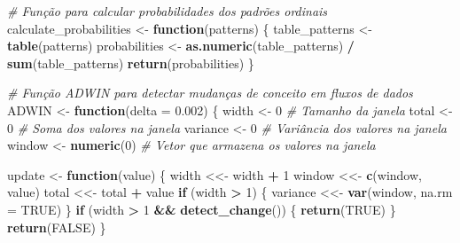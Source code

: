 \documentclass[
]{article}
\newenvironment{Shaded}{\begin{snugshade}}{\end{snugshade}}
\newcommand{\AttributeTok}[1]{\textcolor[rgb]{0.13,0.29,0.53}{#1}}
\newcommand{\CommentTok}[1]{\textcolor[rgb]{0.56,0.35,0.01}{\textit{#1}}}
\newcommand{\ConstantTok}[1]{\textcolor[rgb]{0.56,0.35,0.01}{#1}}
\newcommand{\ControlFlowTok}[1]{\textcolor[rgb]{0.13,0.29,0.53}{\textbf{#1}}}
\newcommand{\DecValTok}[1]{\textcolor[rgb]{0.00,0.00,0.81}{#1}}
\newcommand{\FloatTok}[1]{\textcolor[rgb]{0.00,0.00,0.81}{#1}}
\newcommand{\FunctionTok}[1]{\textcolor[rgb]{0.13,0.29,0.53}{\textbf{#1}}}
\newcommand{\NormalTok}[1]{#1}
\newcommand{\OtherTok}[1]{\textcolor[rgb]{0.56,0.35,0.01}{#1}}
\newcommand{\SpecialCharTok}[1]{\textcolor[rgb]{0.81,0.36,0.00}{\textbf{#1}}}
\begin{document}
\begin{Shaded}
\begin{Highlighting}[]
\CommentTok{\# Função para calcular probabilidades dos padrões ordinais}
\NormalTok{calculate\_probabilities }\OtherTok{\textless{}{-}} \ControlFlowTok{function}\NormalTok{(patterns) \{}
\NormalTok{  table\_patterns }\OtherTok{\textless{}{-}} \FunctionTok{table}\NormalTok{(patterns)}
\NormalTok{  probabilities }\OtherTok{\textless{}{-}} \FunctionTok{as.numeric}\NormalTok{(table\_patterns) }\SpecialCharTok{/} \FunctionTok{sum}\NormalTok{(table\_patterns)}
  \FunctionTok{return}\NormalTok{(probabilities)}
\NormalTok{\}}

\CommentTok{\# Função ADWIN para detectar mudanças de conceito em fluxos de dados}
\NormalTok{ADWIN }\OtherTok{\textless{}{-}} \ControlFlowTok{function}\NormalTok{(}\AttributeTok{delta =} \FloatTok{0.002}\NormalTok{) \{}
\NormalTok{  width }\OtherTok{\textless{}{-}} \DecValTok{0} \CommentTok{\# Tamanho da janela}
\NormalTok{  total }\OtherTok{\textless{}{-}} \DecValTok{0} \CommentTok{\# Soma dos valores na janela}
\NormalTok{  variance }\OtherTok{\textless{}{-}} \DecValTok{0} \CommentTok{\# Variância dos valores na janela}
\NormalTok{  window }\OtherTok{\textless{}{-}} \FunctionTok{numeric}\NormalTok{(}\DecValTok{0}\NormalTok{) }\CommentTok{\# Vetor que armazena os valores na janela}
  
\NormalTok{  update }\OtherTok{\textless{}{-}} \ControlFlowTok{function}\NormalTok{(value) \{}
\NormalTok{    width }\OtherTok{\textless{}\textless{}{-}}\NormalTok{ width }\SpecialCharTok{+} \DecValTok{1}
\NormalTok{    window }\OtherTok{\textless{}\textless{}{-}} \FunctionTok{c}\NormalTok{(window, value)}
\NormalTok{    total }\OtherTok{\textless{}\textless{}{-}}\NormalTok{ total }\SpecialCharTok{+}\NormalTok{ value}
    \ControlFlowTok{if}\NormalTok{ (width }\SpecialCharTok{\textgreater{}} \DecValTok{1}\NormalTok{) \{}
\NormalTok{      variance }\OtherTok{\textless{}\textless{}{-}} \FunctionTok{var}\NormalTok{(window, }\AttributeTok{na.rm =} \ConstantTok{TRUE}\NormalTok{)}
\NormalTok{    \}}
    \ControlFlowTok{if}\NormalTok{ (width }\SpecialCharTok{\textgreater{}} \DecValTok{1} \SpecialCharTok{\&\&} \FunctionTok{detect\_change}\NormalTok{()) \{}
      \FunctionTok{return}\NormalTok{(}\ConstantTok{TRUE}\NormalTok{)}
\NormalTok{    \}}
    \FunctionTok{return}\NormalTok{(}\ConstantTok{FALSE}\NormalTok{)}
\NormalTok{  \}}
  

\end{Highlighting}
\end{Shaded}
\end{document}
